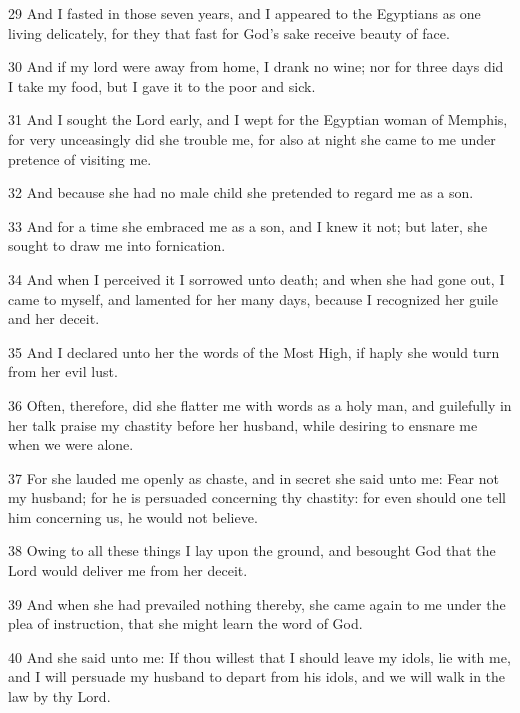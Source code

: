 \par 29 And I fasted in those seven years, and I appeared to the Egyptians as one living delicately, for they that fast for God's sake receive beauty of face.

\par 30 And if my lord were away from home, I drank no wine; nor for three days did I take my food, but I gave it to the poor and sick.

\par 31 And I sought the Lord early, and I wept for the Egyptian woman of Memphis, for very unceasingly did she trouble me, for also at night she came to me under pretence of visiting me.

\par 32 And because she had no male child she pretended to regard me as a son.

\par 33 And for a time she embraced me as a son, and I knew it not; but later, she sought to draw me into fornication.

\par 34 And when I perceived it I sorrowed unto death; and when she had gone out, I came to myself, and lamented for her many days, because I recognized her guile and her deceit.

\par 35 And I declared unto her the words of the Most High, if haply she would turn from her evil lust.

\par 36 Often, therefore, did she flatter me with words as a holy man, and guilefully in her talk praise my chastity before her husband, while desiring to ensnare me when we were alone.

\par 37 For she lauded me openly as chaste, and in secret she said unto me: Fear not my husband; for he is persuaded concerning thy chastity: for even should one tell him concerning us, he would not believe.

\par 38 Owing to all these things I lay upon the ground, and besought God that the Lord would deliver me from her deceit.

\par 39 And when she had prevailed nothing thereby, she came again to me under the plea of instruction, that she might learn the word of God.

\par 40 And she said unto me: If thou willest that I should leave my idols, lie with me, and I will persuade my husband to depart from his idols, and we will walk in the law by thy Lord.


